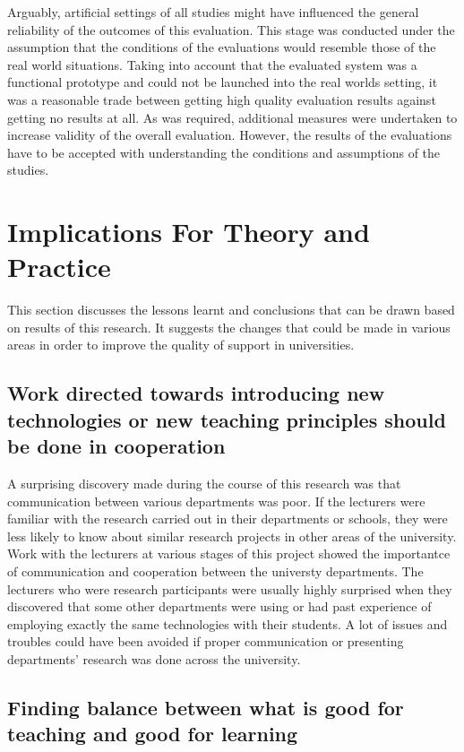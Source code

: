 Arguably, artificial settings of all studies might have influenced the general
reliability of the outcomes of this evaluation. This stage was conducted
under the assumption that the conditions of the evaluations would resemble those
of the real world situations. Taking into account that the evaluated system was
a functional prototype and could not be launched into the real worlds setting,
it was a reasonable trade between getting high quality evaluation results
against getting no results at all. As was required, additional measures were
undertaken to increase validity of the overall evaluation. However, the results
of the evaluations have to be accepted with understanding the conditions and
assumptions of the studies.

\section{Implications For Theory and Practice}

This section discusses the lessons learnt and conclusions that can be drawn
based on results of this research. It suggests the changes that could be made in
various areas in order to improve the quality of \LLLs support in universities.

\subsection[Cooperation and Communication]{Work directed towards introducing
new technologies or new teaching principles should be done in cooperation}

A surprising discovery made during the course of this research was that
communication between various departments was poor. If the lecturers were
familiar with the research carried out in their departments or schools, they
were less likely to know about similar research projects in other areas of
the university. Work with the lecturers at various stages of this project showed
the importantce of communication and cooperation between the universty
departments. The lecturers who were research participants were usually highly
surprised when they discovered that some other departments were using or had
past experience of employing exactly the same technologies with their students.
A lot of issues and troubles could have been avoided if proper communication or
presenting departments' research was done across the university.

\subsection[Finding Balance]{Finding balance between what is good for teaching
and good for learning}

